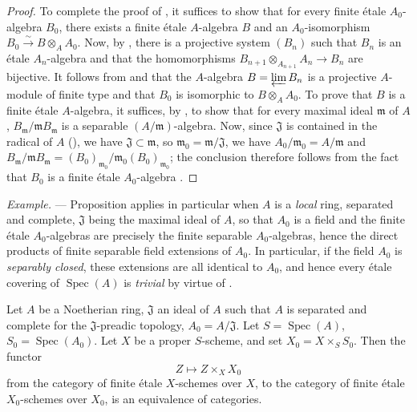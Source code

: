\begin{proof}
To complete the proof of , it suffices to show that for every finite \'etale $A_0$-algebra $B_0$, there exists a finite \'etale $A$-algebra $B$ and an $A_0$-isomorphism $B_0\xrightarrow{\sim}B\otimes_A A_0$.
Now, by , there is a projective system $(B_n)$ such that $B_n$ is an \'etale $A_n$-algebra and that the homomorphisms $B_{n+1}\otimes_{A_{n+1}}A_n\to B_n$ are bijective.
It follows from  and  that the $A$-algebra $B=\varprojlim B_n$ is a projective $A$-module of finite type and that $B_0$ is isomorphic to $B\otimes_A A_0$.
To prove that $B$ is a finite \'etale $A$-algebra, it suffices, by , to show that for every maximal ideal $\mathfrak{m}$ of $A$, $B_\mathfrak{m}/\mathfrak{m}B_\mathfrak{m}$ is a separable $(A/\mathfrak{m})$-algebra.
Now, since $\mathfrak{J}$ is contained in the radical of $A$ (),
we have $\mathfrak{J}\subset\mathfrak{m}$, so $\mathfrak{m}_0=\mathfrak{m}/\mathfrak{J}$, we have $A_0/\mathfrak{m}_0=A/\mathfrak{m}$ and $B_\mathfrak{m}/\mathfrak{m}B_\mathfrak{m}=(B_0)_{\mathfrak{m}_0}/\mathfrak{m}_0(B_0)_{\mathfrak{m}_0}$;
the conclusion therefore follows from the fact that $B_0$ is a finite \'etale $A_0$-algebra .
\end{proof}

\begin{env}[18.3.3]
\label{IV.18.3.3}
\emph{Example.} ---
Proposition  applies in particular when $A$ is a \emph{local} ring, separated and complete, $\mathfrak{J}$ being the maximal ideal of $A$, so that $A_0$ is a field and the finite \'etale $A_0$-algebras are precisely the finite separable $A_0$-algebras, hence the direct products of finite separable field extensions of $A_0$.
In particular, if the field $A_0$ is \emph{separably closed}, these extensions are all identical to $A_0$, and hence every \'etale covering of $\operatorname{Spec}(A)$ is \emph{trivial}  by virtue of .
\end{env}

\begin{theorem}[18.3.4]
\label{IV.18.3.4}
Let $A$ be a Noetherian ring, $\mathfrak{J}$ an ideal of $A$ such that $A$ is separated and complete for the $\mathfrak{J}$-preadic topology, $A_0=A/\mathfrak{J}$.
Let $S=\operatorname{Spec}(A)$, $S_0=\operatorname{Spec}(A_0)$.
Let $X$ be a proper $S$-scheme, and set $X_0=X\times_S S_0$.
Then the functor
\[
Z\mapsto Z\times_X X_0
\]
from the category of finite \'etale $X$-schemes over $X$, to the category of finite \'etale $X_0$-schemes over $X_0$, is an equivalence of categories.
\end{theorem}

